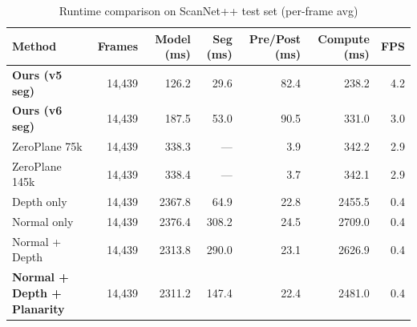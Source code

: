 \documentclass[10pt]{article}
\begin{document}
\begin{table}[t]
  \centering
  \caption{Runtime comparison on ScanNet++ test set (per-frame avg)}
  \label{tab:runtime_combined}
  \begin{tabular}{l r r r r r r}
    \toprule
    Method & Frames & Model (ms) & Seg (ms) & Pre/Post (ms) & Compute (ms) & FPS \\
    \midrule
    \textbf{Ours (v5 seg)} & 14,439 & 126.2 & 29.6 & 82.4 & 238.2 & 4.2 \\
    \textbf{Ours (v6 seg)} & 14,439 & 187.5 & 53.0 & 90.5 & 331.0 & 3.0 \\
    ZeroPlane 75k & 14,439 & 338.3 & --- & 3.9 & 342.2 & 2.9 \\
    ZeroPlane 145k & 14,439 & 338.4 & --- & 3.7 & 342.1 & 2.9 \\
    Depth only & 14,439 & 2367.8 & 64.9 & 22.8 & 2455.5 & 0.4 \\
    Normal only & 14,439 & 2376.4 & 308.2 & 24.5 & 2709.0 & 0.4 \\
    Normal + Depth & 14,439 & 2313.8 & 290.0 & 23.1 & 2626.9 & 0.4 \\
    \textbf{Normal + Depth + Planarity} & 14,439 & 2311.2 & 147.4 & 22.4 & 2481.0 & 0.4 \\
    \bottomrule
  \end{tabular}
\end{table}

\clearpage
\end{document}
